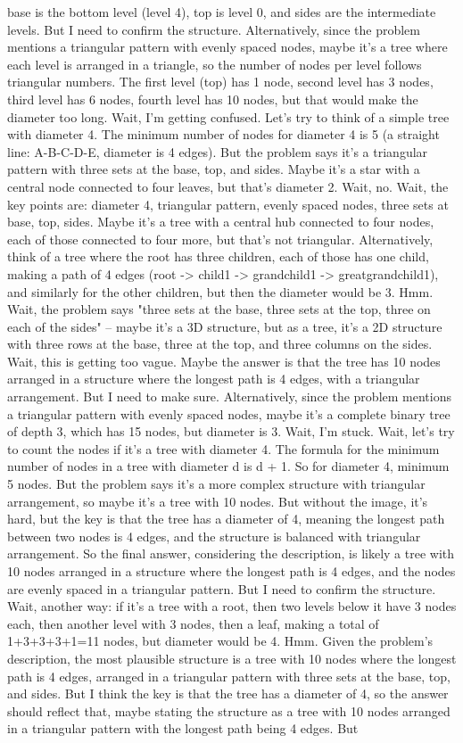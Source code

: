 base is the bottom level (level 4), top is level 0, and sides are the intermediate levels. But I need to confirm the structure. Alternatively, since the problem mentions a triangular pattern with evenly spaced nodes, maybe it's a tree where each level is arranged in a triangle, so the number of nodes per level follows triangular numbers. The first level (top) has 1 node, second level has 3 nodes, third level has 6 nodes, fourth level has 10 nodes, but that would make the diameter too long. Wait, I'm getting confused. Let's try to think of a simple tree with diameter 4. The minimum number of nodes for diameter 4 is 5 (a straight line: A-B-C-D-E, diameter is 4 edges). But the problem says it's a triangular pattern with three sets at the base, top, and sides. Maybe it's a star with a central node connected to four leaves, but that's diameter 2. Wait, no. Wait, the key points are: diameter 4, triangular pattern, evenly spaced nodes, three sets at base, top, sides. Maybe it's a tree with a central hub connected to four nodes, each of those connected to four more, but that's not triangular. Alternatively, think of a tree where the root has three children, each of those has one child, making a path of 4 edges (root -> child1 -> grandchild1 -> greatgrandchild1), and similarly for the other children, but then the diameter would be 3. Hmm. Wait, the problem says "three sets at the base, three sets at the top, three on each of the sides" – maybe it's a 3D structure, but as a tree, it's a 2D structure with three rows at the base, three at the top, and three columns on the sides. Wait, this is getting too vague. Maybe the answer is that the tree has 10 nodes arranged in a structure where the longest path is 4 edges, with a triangular arrangement. But I need to make sure. Alternatively, since the problem mentions a triangular pattern with evenly spaced nodes, maybe it's a complete binary tree of depth 3, which has 15 nodes, but diameter is 3. Wait, I'm stuck. Wait, let's try to count the nodes if it's a tree with diameter 4. The formula for the minimum number of nodes in a tree with diameter d is d + 1. So for diameter 4, minimum 5 nodes. But the problem says it's a more complex structure with triangular arrangement, so maybe it's a tree with 10 nodes. But without the image, it's hard, but the key is that the tree has a diameter of 4, meaning the longest path between two nodes is 4 edges, and the structure is balanced with triangular arrangement. So the final answer, considering the description, is likely a tree with 10 nodes arranged in a structure where the longest path is 4 edges, and the nodes are evenly spaced in a triangular pattern. But I need to confirm the structure. Wait, another way: if it's a tree with a root, then two levels below it have 3 nodes each, then another level with 3 nodes, then a leaf, making a total of 1+3+3+3+1=11 nodes, but diameter would be 4. Hmm. Given the problem's description, the most plausible structure is a tree with 10 nodes where the longest path is 4 edges, arranged in a triangular pattern with three sets at the base, top, and sides. But I think the key is that the tree has a diameter of 4, so the answer should reflect that, maybe stating the structure as a tree with 10 nodes arranged in a triangular pattern with the longest path being 4 edges. But 